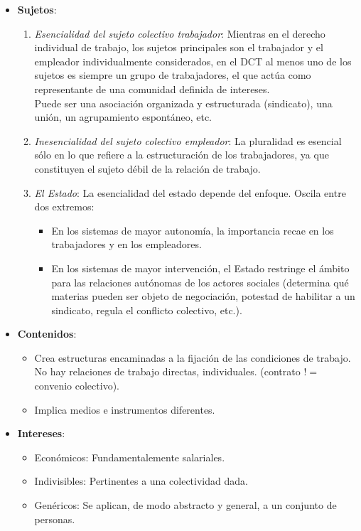 \documentclass[spanish,12pt,a4paper,titlepage]{report}
\begin{document}
\begin{itemize}
\item \textbf{Sujetos}:
  \begin{enumerate}
  \item \textit{Esencialidad del sujeto colectivo trabajador}: Mientras en el derecho individual de trabajo, los sujetos principales son el trabajador y el empleador individualmente considerados, en el DCT al menos uno de los sujetos es siempre un grupo de trabajadores, el que actúa como representante de una comunidad definida de intereses. \\
    Puede ser una asociación organizada y estructurada (sindicato), una unión, un agrupamiento espontáneo, etc.
  \item \textit{Inesencialidad del sujeto colectivo empleador}: La pluralidad es esencial sólo en lo que refiere a la estructuración de los trabajadores, ya que constituyen el sujeto débil de la relación de trabajo.
  \item \textit{El Estado}: La esencialidad del estado depende del enfoque. Oscila entre dos extremos:
    \begin{itemize}
    \item En los sistemas de mayor autonomía, la importancia recae en los trabajadores y en los empleadores.
    \item En los sistemas de mayor intervención, el Estado restringe el ámbito para las relaciones autónomas de los actores sociales (determina qué materias pueden ser objeto de negociación, potestad de habilitar a un sindicato, regula el conflicto colectivo, etc.).
    \end{itemize}
  \end{enumerate}
\item \textbf{Contenidos}:
  \begin{itemize}
  \item Crea estructuras encaminadas a la fijación de las condiciones de trabajo. No hay relaciones de trabajo directas, individuales. (contrato $!=$ convenio colectivo).
  \item Implica medios e instrumentos diferentes.
  \end{itemize}
\item \textbf{Intereses}:
  \begin{itemize}
  \item Económicos: Fundamentalemente salariales.
  \item Indivisibles: Pertinentes a una colectividad dada.
  \item Genéricos: Se aplican, de modo abstracto y general, a un conjunto de personas.

\end{itemize}
\end{itemize}
\end{document}
